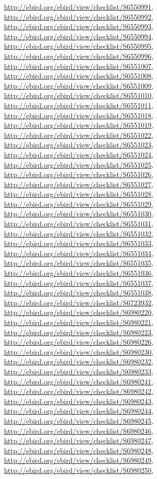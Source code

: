 \documentclass[9pt, article]{memoir}
\begin{document}
\begin{multicols}{2}
\url{http://ebird.org/ebird/view/checklist/S6550991}, 
\url{http://ebird.org/ebird/view/checklist/S6550992}, 
\url{http://ebird.org/ebird/view/checklist/S6550993}, 
\url{http://ebird.org/ebird/view/checklist/S6550994}, 
\url{http://ebird.org/ebird/view/checklist/S6550995}, 
\url{http://ebird.org/ebird/view/checklist/S6550996}, 
\url{http://ebird.org/ebird/view/checklist/S6551007}, 
\url{http://ebird.org/ebird/view/checklist/S6551008}, 
\url{http://ebird.org/ebird/view/checklist/S6551009}, 
\url{http://ebird.org/ebird/view/checklist/S6551010}, 
\url{http://ebird.org/ebird/view/checklist/S6551011}, 
\url{http://ebird.org/ebird/view/checklist/S6551018}, 
\url{http://ebird.org/ebird/view/checklist/S6551019}, 
\url{http://ebird.org/ebird/view/checklist/S6551022}, 
\url{http://ebird.org/ebird/view/checklist/S6551023}, 
\url{http://ebird.org/ebird/view/checklist/S6551024}, 
\url{http://ebird.org/ebird/view/checklist/S6551025}, 
\url{http://ebird.org/ebird/view/checklist/S6551026}, 
\url{http://ebird.org/ebird/view/checklist/S6551027}, 
\url{http://ebird.org/ebird/view/checklist/S6551028}, 
\url{http://ebird.org/ebird/view/checklist/S6551029}, 
\url{http://ebird.org/ebird/view/checklist/S6551030}, 
\url{http://ebird.org/ebird/view/checklist/S6551031}, 
\url{http://ebird.org/ebird/view/checklist/S6551032}, 
\url{http://ebird.org/ebird/view/checklist/S6551033}, 
\url{http://ebird.org/ebird/view/checklist/S6551034}, 
\url{http://ebird.org/ebird/view/checklist/S6551035}, 
\url{http://ebird.org/ebird/view/checklist/S6551036}, 
\url{http://ebird.org/ebird/view/checklist/S6551037}, 
\url{http://ebird.org/ebird/view/checklist/S6551038}, 
\url{http://ebird.org/ebird/view/checklist/S6723932}, 
\url{http://ebird.org/ebird/view/checklist/S6980220}, 
\url{http://ebird.org/ebird/view/checklist/S6980221}, 
\url{http://ebird.org/ebird/view/checklist/S6980223}, 
\url{http://ebird.org/ebird/view/checklist/S6980226}, 
\url{http://ebird.org/ebird/view/checklist/S6980230}, 
\url{http://ebird.org/ebird/view/checklist/S6980232}, 
\url{http://ebird.org/ebird/view/checklist/S6980233}, 
\url{http://ebird.org/ebird/view/checklist/S6980241}, 
\url{http://ebird.org/ebird/view/checklist/S6980242}, 
\url{http://ebird.org/ebird/view/checklist/S6980243}, 
\url{http://ebird.org/ebird/view/checklist/S6980244}, 
\url{http://ebird.org/ebird/view/checklist/S6980245}, 
\url{http://ebird.org/ebird/view/checklist/S6980246}, 
\url{http://ebird.org/ebird/view/checklist/S6980247}, 
\url{http://ebird.org/ebird/view/checklist/S6980248}, 
\url{http://ebird.org/ebird/view/checklist/S6980249}, 
\url{http://ebird.org/ebird/view/checklist/S6980250}, 

\end{multicols}
\end{document}
